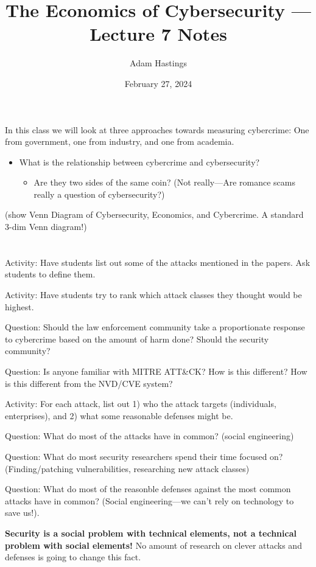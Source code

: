 \documentclass[11pt]{article}
\title{The Economics of Cybersecurity --- Lecture 7 Notes}
\date{February 27, 2024}
\author{Adam Hastings}
\begin{document}
\maketitle


In this class we will look at three approaches towards measuring cybercrime: One from government, one from industry, and one from academia.

\begin{itemize}
    \item What is the relationship between cybercrime and cybersecurity?
    \begin{itemize}
        \item Are they two sides of the same coin? (Not really---Are romance scams really a question of cybersecurity?)
    \end{itemize}
\end{itemize}

(show Venn Diagram of Cybersecurity, Economics, and Cybercrime. A standard 3-dim Venn diagram!)

\section*{}

Activity: Have students list out some of the attacks mentioned in the papers. Ask students to define them. 

Activity: Have students try to rank which attack classes they thought would be highest.

Question: Should the law enforcement community take a proportionate response to cybercrime based on the amount of harm done?
Should the security community?

Question: Is anyone familiar with MITRE ATT\&CK? How is this different? How is this different from the NVD/CVE system?

Activity: For each attack, list out 1) who the attack targets (individuals, enterprises), and 2) what some reasonable defenses might be.

Question: What do most of the attacks have in common? (social engineering)

Question: What do most security researchers spend their time focused on? (Finding/patching vulnerabilities, researching new attack classes)

Question: What do most of the reasonble defenses against the most common attacks have in common? (Social engineering---we can't rely on technology to save us!). 

{\bf Security is a social problem with technical elements, not a technical problem with social elements!}
No amount of research on clever attacks and defenses is going to change this fact.
\end{document}
